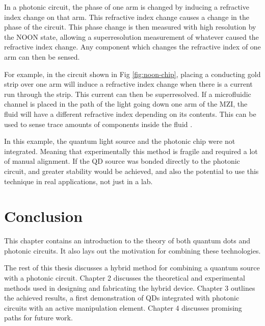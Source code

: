In a photonic circuit, the phase of one arm is changed by inducing a
refractive index  change on that arm. This refractive index change causes a
change in the phase of  the circuit. This phase change is then measured with
high resolution by the NOON state, allowing a superresolution measurement of
whatever caused the refractive index change. Any component which changes the
refractive index of one arm can then be sensed.

For example, in the circuit shown in Fig \ref{fig:noon-chip},  placing a
conducting gold strip over one arm will induce a refractive index change when
there is a current run through the strip. This current can then be
superresolved. If a microfluidic channel is placed in the path of the light
going down one arm of the MZI, the fluid will have a different refractive index
depending on its contents. This can be used to sense trace amounts of components
inside the fluid \cite{crespi2012measuring}.

In this example\cite{bennett2015cavity}, the quantum light source and the photonic chip were not integrated. Meaning
that experimentally this method is fragile and required a lot of manual alignment. If the QD source
was bonded directly to the photonic circuit, and greater stability would be achieved, and also
the potential to use this technique in real applications, not just in a lab.

\section{Conclusion}
This chapter contains an introduction to the theory of both quantum dots and
photonic circuits. It also lays out the motivation for combining these
technologies.

The rest of this thesis discusses a hybrid method for combining a quantum source
with a photonic circuit. Chapter 2 discusses the theoretical and experimental
methods used in designing and fabricating the hybrid device. Chapter 3 outlines
the achieved results, a first demonstration of QDs integrated with photonic
circuits with an active manipulation element. Chapter 4 discusses promising
paths for future work.

